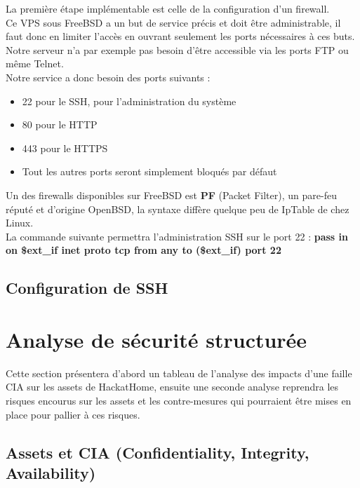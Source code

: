 \documentclass[a4paper,10pt,final,fleqn]{article}
\begin{document}
			La première étape implémentable est celle de la configuration d'un firewall.\\
			Ce VPS sous FreeBSD a un but de service précis et doit être administrable, il faut donc en limiter l'accès en ouvrant seulement les ports nécessaires à ces buts. Notre serveur n'a par exemple pas besoin d'être accessible via les ports FTP ou même Telnet.\\

			Notre service a donc besoin des ports suivants : \\
			\begin{itemize}
				\item 22 pour le SSH, pour l'administration du système
				\item 80 pour le HTTP
				\item 443 pour le HTTPS
				\item Tout les autres ports seront simplement bloqués par défaut
			\end{itemize}

			Un des firewalls disponibles sur FreeBSD est \textbf{PF} (Packet Filter), un pare-feu réputé et d'origine OpenBSD, la syntaxe diffère quelque peu de IpTable de chez Linux.\\

			La commande suivante permettra l'administration SSH sur le port 22 : \textbf{pass in on \$ext\_if inet proto tcp from any to (\$ext\_if) port 22}

		\subsection{Configuration de SSH}

	\section{Analyse de sécurité structurée}

		Cette section présentera d'abord un tableau de l'analyse des impacts d'une faille CIA sur les assets de HackatHome, ensuite une seconde analyse reprendra les risques encourus sur les assets et les contre-mesures qui pourraient être mises en place pour pallier à ces risques.\\

		\subsection{Assets et CIA (Confidentiality, Integrity, Availability)}
\end{document}
